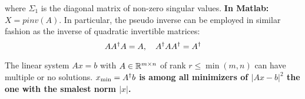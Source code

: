 where $\Sigma_1$ is the diagonal matrix of non-zero singular values.
\textbf{In Matlab:} $X = pinv(A)$.
In particular, the pseudo inverse can be employed in similar fashion
as the inverse of quadratic invertible matrices:
	\[A A^{\dagger} A = A, \quad A^{\dagger} A A^{\dagger} = A^{\dagger}\]

The linear system $Ax = b$ with $A \in \mathbb{R}^{m \times{} n}$ of rank $r \le \min(m,n)$
can have multiple or no solutions.
$x_{\min} = A^{\dagger}b$ \textbf{is among all minimizers of $|Ax-b|^2$
the one with the smalest norm $|x|$.}
